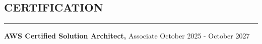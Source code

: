 \documentclass{article}
\begin{document}
\subsection*{CERTIFICATION}
\vspace{-0.1em}
\hrule
\vspace{0.4em}
{\bf AWS Certified Solution Architect, }Associate \hfill October 2025 - October 2027 \\
\end{document}
